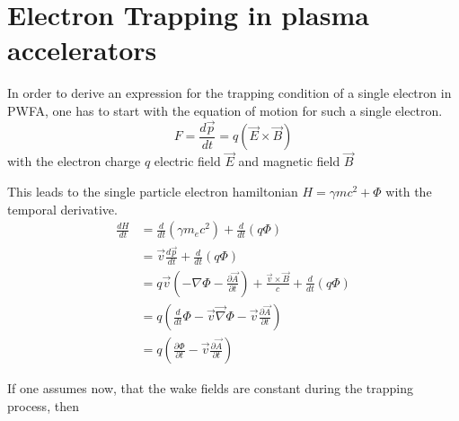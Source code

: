 \section{Electron Trapping in plasma accelerators}

In order to derive an expression for the trapping condition of a single electron in PWFA, one has to start with the equation of motion for such a single electron. 
\begin{equation}
F=\frac{d\vec{p}}{dt}=q(\vec{E}\times \vec{B})
\end{equation}
with the electron charge $q$ electric field $\vec{E}$ and magnetic field $\vec{B}$

This leads to the single particle electron hamiltonian $ H=\gamma m c^2+\Phi$ with the temporal derivative.
\begin{align}
\frac{dH}{dt}&=\frac{d}{dt} (\gamma m_e c^2)+\frac{d}{dt}(q\Phi)\\
&=\vec{v}\frac{d\vec{p}}{dt}+\frac{d}{dt}(q\Phi)\\
&=q\vec{v}(-\nabla \Phi-\frac{\partial \vec{A}}{\partial t})+\frac{\vec{v}\times\vec{B}}{c}+\frac{d}{dt}(q\Phi)\\
&=q(\frac{d}{dt}\Phi-\vec{v}\vec{\nabla}\Phi-\vec{v}\frac{\partial \vec{A}}{\partial t})\\
&=q(\frac{\partial \Phi}{\partial t}-\vec{v}\frac{\partial \vec{A}}{\partial t})
\end{align}

If one assumes now, that the wake fields are constant during the trapping process, then 

